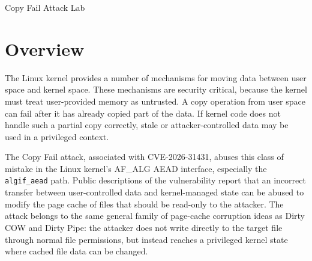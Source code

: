 
\newcommand{\commonfolder}{../../../common-files}







\begin{center}
{\LARGE Copy Fail Attack Lab}
\end{center}



\section{Overview}

The Linux kernel provides a number of mechanisms for moving data between
user space and kernel space. These mechanisms are security critical, because
the kernel must treat user-provided memory as untrusted. A copy operation from
user space can fail after it has already copied part of the data. If kernel
code does not handle such a partial copy correctly, stale or attacker-controlled
data may be used in a privileged context.

The Copy Fail attack, associated with CVE-2026-31431, abuses this class of
mistake in the Linux kernel's AF\_ALG AEAD interface, especially the
\texttt{algif\_aead} path. Public descriptions of the vulnerability report
that an incorrect transfer between user-controlled data and kernel-managed
state can be abused to modify the page cache of files that should be read-only
to the attacker. The attack belongs to the same general family of page-cache
corruption ideas as Dirty COW and Dirty Pipe: the attacker does not write
directly to the target file through normal file permissions, but instead
reaches a privileged kernel state where cached file data can be changed.

